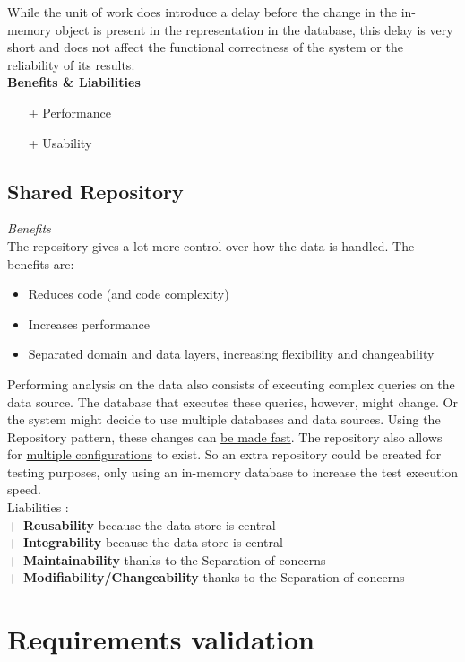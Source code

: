 While the unit of work does introduce a delay before the change in the in-memory object is present in the representation in the database, this delay is very short and does not affect the functional correctness of the system or the reliability of its results.\\
\textbf{Benefits \& Liabilities} ~
\begin{itemize}
\item[+] Performance 
\item[+] Usability
\end{itemize}


\subsection*{Shared Repository} 

\textit{Benefits} \\

The repository gives a lot more control over how the data is handled. The benefits are:
\begin{itemize}
\item Reduces code (and code complexity)
\item Increases performance
\item Separated domain and data layers, increasing flexibility and changeability
\end{itemize}

Performing analysis on the data also consists of executing complex queries on the data source. The database that executes these queries, however, might change. Or the system might decide to use multiple databases and data sources.
Using the Repository pattern, these changes can \underline{be made fast}. The repository also allows for \underline{multiple configurations} to exist. So an extra repository could be created for testing purposes, only using an in-memory database to increase the test execution speed. \\

\textit{} Liabilities : \\
\textbf{+ Reusability} because the data store is central \\
\textbf{+ Integrability} because the data store is central \\
\textbf{+ Maintainability} thanks to the Separation of concerns \\
\textbf{+ Modifiability/Changeability} thanks to the Separation of concerns\\

\section{Requirements validation}
\label{sec:req-validation}




